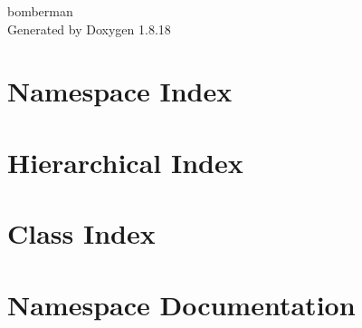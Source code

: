 \let\mypdfximage\pdfximage\def\pdfximage{\immediate\mypdfximage}\documentclass[twoside]{book}
\newcommand{\+}{\discretionary{\mbox{\scriptsize$\hookleftarrow$}}{}{}}
\newcommand{\clearemptydoublepage}{%
  \newpage{\pagestyle{empty}\cleardoublepage}%
}
\begin{document}
\hypersetup{pageanchor=false,
             bookmarksnumbered=true,
             pdfencoding=unicode
            }
\begin{titlepage}
\vspace*{7cm}
\begin{center}%
{\Large bomberman }\\
\vspace*{1cm}
{\large Generated by Doxygen 1.8.18}\\
\end{center}
\end{titlepage}
\clearemptydoublepage
{}
\tableofcontents
\clearemptydoublepage
{}
\hypersetup{pageanchor=true}

\chapter{Namespace Index}

\chapter{Hierarchical Index}

\chapter{Class Index}

\chapter{Namespace Documentation}


\end{document}
